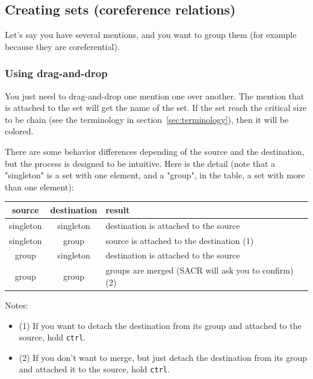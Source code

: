\documentclass[12pt]{article}
\begin{document}
 \subsection{Creating sets (coreference relations)}

Let's say you have several mentions, and you want to group them (for example
because they are coreferential).

 \subsubsection{Using drag-and-drop}

You just need to drag-and-drop one mention one over another.  The mention
that is attached to the set will get the name of the set.  If the set reach
the critical size to be chain (see the terminology in
section~\ref{sec:terminology}), then it will be colored.

There are some behavior differences depending of the source and the
destination, but the process is designed to be intuitive.  Here is the
detail (note that a "singleton" is a set with one element, and a "group", in
the table, a set with more than one element):

\begin{tabular}{c|c|m{10.5cm}}
\textbf{source} & \textbf{destination}& \textbf{result}\\\hline
singleton & singleton& destination is attached to the source\\\hline
singleton & group & source is attached to the destination (1)\\\hline
group & singleton & destination is attached to the source\\\hline
group & group & groups are merged (SACR will ask you to confirm) (2)\\
\end{tabular}

Notes:
\begin{itemize}
   \item (1) If you want to detach the destination from its group and
   attached to the source, hold \verb|ctrl|.
   \item (2) If you don't want to merge, but just detach the destination from
   its group and attached it to the source, hold \verb|ctrl|.
\end{itemize}
\end{document}
